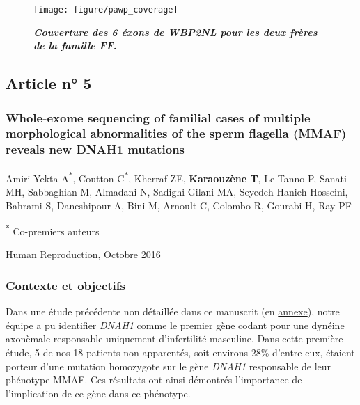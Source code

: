 \documentclass[12pt,twoside]{ugathesis}
\begin{document}
\begin{figure}

{\centering \texttt{[image: figure/pawp\_coverage]} 

}

\caption[Couverture des 6 éxons de WBP2NL pour les deux frères de la famille FF]{\textbf{\emph{Couverture des 6 éxons de WBP2NL pour
les deux frères de la famille FF}.}}\label{fig:plotcovplcz}
\end{figure}




\newpage

\subsection{Article n° 5}\label{article-n-5}

\subsubsection{Whole-exome sequencing of familial cases of multiple
morphological abnormalities of the sperm flagella (MMAF) reveals new
DNAH1
mutations}\label{whole-exome-sequencing-of-familial-cases-of-multiple-morphological-abnormalities-of-the-sperm-flagella-mmaf-reveals-new-dnah1-mutations}

Amiri-Yekta A\textsuperscript{*}, Coutton C\textsuperscript{*}, Kherraf
ZE, \textbf{Karaouzène T}, Le Tanno P, Sanati MH, Sabbaghian M, Almadani
N, Sadighi Gilani MA, Seyedeh Hanieh Hosseini, Bahrami S, Daneshipour A,
Bini M, Arnoult C, Colombo R, Gourabi H, Ray PF

\textsuperscript{*} Co-premiers auteurs

Human Reproduction, Octobre 2016

\newpage

\subsubsection{Contexte et objectifs}\label{contexte-et-objectifs-2}

Dans une étude précédente non détaillée dans ce manuscrit (en
\protect\hyperlink{dnah12014}{annexe}), notre équipe a pu identifier
\emph{DNAH1} comme le premier gène codant pour une dynéine axonèmale
responsable uniquement d'infertilité masculine. Dans cette première
étude, 5 de nos 18 patients non-apparentés, soit environs 28\% d'entre
eux, étaient porteur d'une mutation homozygote sur le gène \emph{DNAH1}
responsable de leur phénotype MMAF. Ces résultats ont ainsi démontrés
l'importance de l'implication de ce gène dans ce phénotype.
\end{document}

